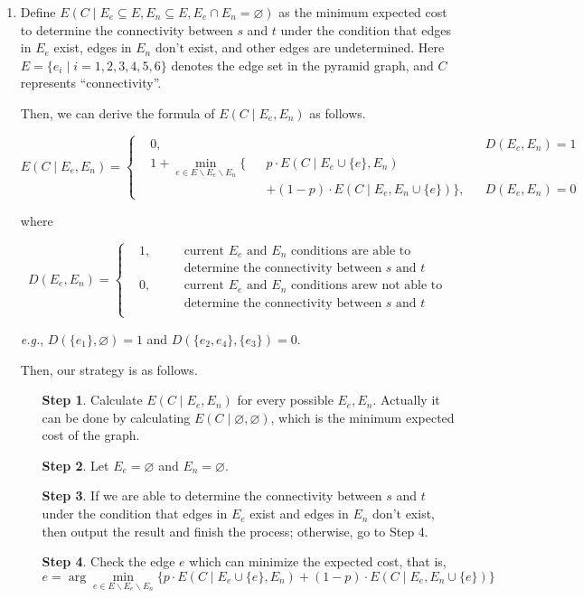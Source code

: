 \documentclass{oxmathproblems}
\makeatletter
\theoremstyle{definition}
\renewenvironment{solution}[1][Solution] {\par\pushQED{\qed}\normalfont\topsep6\p@\@plus6\p@\relax\trivlist\item[\hskip\labelsep\bfseries#1\@addpunct{.}]\ignorespaces}{\popQED\endtrivlist\@endpefalse} \makeatother
\makeatother
\begin{document}
\begin{enumerate}
\begin{solution}
	\iffalse
	Define $E(C \mid E_e \subseteq E, E_n \subseteq E, E_e \cap E_n = \varnothing)$ as the minimum expected cost to determine the connectivity between $s$ and $t$ under the condition that edges in $E_e$ exist, edges in $E_n$ don't exist, and other edges are undetermined. Here $E = \{e_i \mid i=1,2,3,4,5,6\}$ denotes the edge set in the pyramid graph, and $C$ represents ``connectivity''.
	
	Then, we can derive the formula of $E(C\mid E_e, E_n)$ as follows.
	
	$$
	E(C\mid E_e, E_n)=\left\{\begin{aligned}
	& 0, &&&& D(E_e, E_n) = 1 \\
	& 1 + \min_{e \in E \backslash E_e \backslash E_n}\{&&p\cdot E(C\mid E_e \cup \{e\}, E_n) && \\
	&&& + (1-p)\cdot E(C\mid E_e, E_n \cup \{e\})\}, && D(E_e, E_n) = 0
	\end{aligned}
	\right.
	$$
	
	where
	
	$$
	D(E_e, E_n) = \left\{\begin{aligned}
	& 1, \quad && \textrm{current $E_e$ and $E_n$ conditions are able to} \\
	&&& \textrm{determine the connectivity between $s$ and $t$} \\
	& 0, \quad && \textrm{current $E_e$ and $E_n$ conditions arew not able to} \\
	&&& \textrm{determine the connectivity between $s$ and $t$} \\
	\end{aligned}\right.
	$$
	
	\textit{e.g.}, $D(\{e_1\}, \varnothing) = 1$ and $D(\{e_2, e_4\},\{e_3\}) = 0$.
	
	Then, our strategy is as follows.
	
	\begin{enumerate}
		\item [\textbf{Step 1}. ] Calculate $E(C\mid E_e, E_n)$ for every possible $E_e, E_n$. Actually it can be done by calculating $E(C\mid \varnothing, \varnothing)$, which is the minimum expected cost of the graph. 
		\item [\textbf{Step 2}. ] Let $E_e = \varnothing$ and $E_n = \varnothing$.
		\item [\textbf{Step 3}. ] If we are able to determine the connectivity between $s$ and $t$ under the condition that edges in $E_e$ exist and edges in $E_n$ don't exist, then output the result and finish the process; otherwise, go to Step 4.
		\item [\textbf{Step 4}. ] Check the edge $e$ which can minimize the expected cost, that is,	
		$$
		e = \arg\min_{e \in E\backslash E_e\backslash E_n} \{p\cdot E(C\mid E_e \cup \{e\}, E_n) + (1-p)\cdot E(C\mid E_e, E_n \cup \{e\})\}
		$$
		 

\end{enumerate}
\end{solution}
\end{enumerate}
\end{document}
